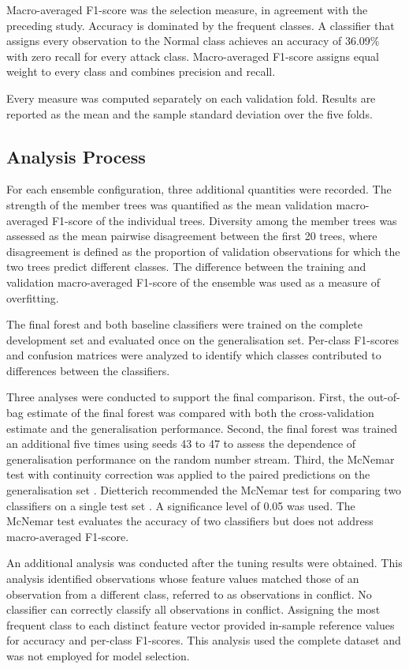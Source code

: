 \documentclass[conference]{IEEEtran}
\begin{document}
Macro-averaged F1-score was the selection measure, in agreement with the preceding study. Accuracy is dominated by the frequent classes. A classifier that assigns every observation to the Normal class achieves an accuracy of 36.09\% with zero recall for every attack class. Macro-averaged F1-score assigns equal weight to every class and combines precision and recall.

Every measure was computed separately on each validation fold. Results are reported as the mean and the sample standard deviation over the five folds.

\subsection{Analysis Process}
For each ensemble configuration, three additional quantities were recorded. The strength of the member trees was quantified as the mean validation macro-averaged F1-score of the individual trees. Diversity among the member trees was assessed as the mean pairwise disagreement between the first 20 trees, where disagreement is defined as the proportion of validation observations for which the two trees predict different classes. The difference between the training and validation macro-averaged F1-score of the ensemble was used as a measure of overfitting.

The final forest and both baseline classifiers were trained on the complete development set and evaluated once on the generalisation set. Per-class F1-scores and confusion matrices were analyzed to identify which classes contributed to differences between the classifiers.

Three analyses were conducted to support the final comparison. First, the out-of-bag estimate of the final forest was compared with both the cross-validation estimate and the generalisation performance. Second, the final forest was trained an additional five times using seeds 43 to 47 to assess the dependence of generalisation performance on the random number stream. Third, the McNemar test with continuity correction was applied to the paired predictions on the generalisation set \cite{mcnemar}. Dietterich recommended the McNemar test for comparing two classifiers on a single test set \cite{dietterich1998}. A significance level of 0.05 was used. The McNemar test evaluates the accuracy of two classifiers but does not address macro-averaged F1-score.

An additional analysis was conducted after the tuning results were obtained. This analysis identified observations whose feature values matched those of an observation from a different class, referred to as observations in conflict. No classifier can correctly classify all observations in conflict. Assigning the most frequent class to each distinct feature vector provided in-sample reference values for accuracy and per-class F1-scores. This analysis used the complete dataset and was not employed for model selection.
\end{document}
